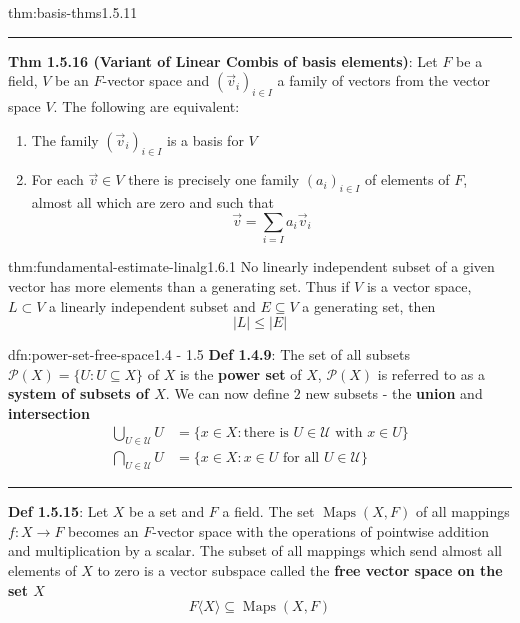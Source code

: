 \documentclass[landscape, 8pt]{extarticle}
\DeclareMathOperator{\Maps}{Maps}
\begin{document}
\begin{multicols}{3}
\begin{thm}{thm:basis-thms}{1.5.11}
    \vspace{-5pt}
    \noindent\rule{\textwidth}{0.2pt}
    \textbf{Thm 1.5.16 (Variant of Linear Combis of basis elements)}: Let $F$ be a field, $V$ be an $F$-vector space and $(\vec{v}_{i})_{i\in I}$ a family of vectors from the vector space $V$. The following are equivalent:
    \begin{enumerate}
        \setlength\itemsep{0em}
        \item The family $(\vec{v}_{i})_{i\in I}$ is a basis for $V$
        \item For each $\vec{v}\in V$ there is precisely one family $(a_{i})_{i\in I}$ of elements of $F$, almost all which are zero and such that
            \[\vec{v} = \sum_{i = I} a_{i}\vec{v}_{i}\]
    \end{enumerate}

\end{thm}


\begin{thm}{thm:fundamental-estimate-linalg}{1.6.1}
    No linearly independent subset of a given vector has more elements than a generating set. Thus if $V$ is a vector space, $L \subset V$ a linearly independent subset and $E \subseteq V$ a generating set, then
    \[\lvert L \rvert \le \lvert E \rvert\]
\end{thm} 

\begin{dfn}{dfn:power-set-free-space}{1.4 - 1.5}
    \textbf{Def 1.4.9}: The set of all subsets $\mathcal{P}(X) = \{U : U\subseteq X\}$ of $X$ is the \textbf{power set} of $X$, $\mathcal{P}(X)$ is referred to as a \textbf{system of subsets of $X$}. We can now define $2$ new subsets - the \textbf{union} and \textbf{intersection}
    \begin{align*}
        \textstyle\bigcup\limits_{U \in\mathcal{U}} U &= \{x \in X : \text{there is $U\in \mathcal{U}$ with $x\in U$}\} \\
        \textstyle\bigcap\limits_{U \in\mathcal{U}} U &= \{x \in X : \text{$x\in U$ for all $U\in \mathcal{U}$}\}
    \end{align*}

    \noindent\rule{\textwidth}{0.2pt}

    \textbf{Def 1.5.15}: Let $X$ be a set and $F$ a field. The set $\Maps(X, F)$ of all mappings $f: X \to F $ becomes an $F$-vector space with the operations of pointwise addition and multiplication by a scalar. The subset of all mappings which send almost all elements of $X$ to zero is a vector subspace called the \textbf{free vector space on the set $X$}
    \[F\langle X \rangle \subseteq \Maps(X, F)\]
\end{dfn}


\end{multicols}
\end{document}
